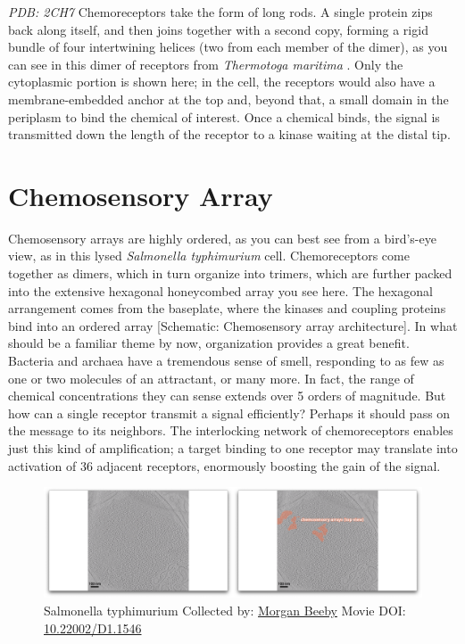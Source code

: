 \documentclass[]{tufte-book}
\begin{document}
\emph{PDB: 2CH7} Chemoreceptors take the form of long rods. A single
protein zips back along itself, and then joins together with a second
copy, forming a rigid bundle of four intertwining helices (two from each
member of the dimer), as you can see in this dimer of receptors from
\emph{Thermotoga maritima} \citep{park2006}. Only the cytoplasmic
portion is shown here; in the cell, the receptors would also have a
membrane-embedded anchor at the top and, beyond that, a small domain in
the periplasm to bind the chemical of interest. Once a chemical binds,
the signal is transmitted down the length of the receptor to a kinase
waiting at the distal tip.

\section{Chemosensory Array}\label{chemosensory-array}

Chemosensory arrays are highly ordered, as you can best see from a
bird's-eye view, as in this lysed \emph{Salmonella typhimurium} cell.
Chemoreceptors come together as dimers, which in turn organize into
trimers, which are further packed into the extensive hexagonal
honeycombed array you see here. The hexagonal arrangement comes from the
baseplate, where the kinases and coupling proteins bind into an ordered
array {[}Schematic: Chemosensory array architecture{]}. In what should
be a familiar theme by now, organization provides a great benefit.
Bacteria and archaea have a tremendous sense of smell, responding to as
few as one or two molecules of an attractant, or many more. In fact, the
range of chemical concentrations they can sense extends over 5 orders of
magnitude. But how can a single receptor transmit a signal efficiently?
Perhaps it should pass on the message to its neighbors. The interlocking
network of chemoreceptors enables just this kind of amplification; a
target binding to one receptor may translate into activation of 36
adjacent receptors, enormously boosting the gain of the signal.





\begin{figure}
\includegraphics{movie_stills/7_2} \caption[Salmonella typhimurium Collected by:
\protect\hyperlink{morgan_beeby}{Morgan Beeby} Movie DOI:
\href{https://doi.org/10.22002/D1.1546}{10.22002/D1.1546}]{Salmonella typhimurium Collected by:
\protect\hyperlink{morgan_beeby}{Morgan Beeby} Movie DOI:
\href{https://doi.org/10.22002/D1.1546}{10.22002/D1.1546}}\label{fig:7-2}
\end{figure}
\end{document}
